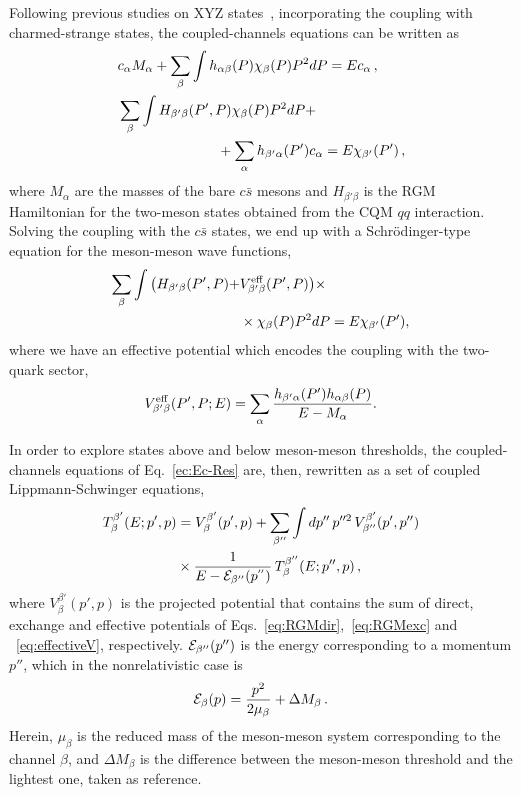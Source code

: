 \documentclass[aps, prd, floatfix, twocolumn, superscriptaddress, nofootinbib]{revtex4-1}
\begin{document}
Following previous studies on XYZ states~\cite{Ortega:2012rs},
incorporating the coupling with charmed-strange states, the coupled-channels
equations can be written as
\begin{equation}
\begin{split}
&
c_\alpha M_\alpha +  \sum_\beta \int h_{\alpha\beta}(P) \chi_\beta(P)P^2 dP = E
c_\alpha\,, \\
&
\sum_{\beta}\int H_{\beta'\beta}(P',P)\chi_{\beta}(P) P^2 dP + \\
&
\hspace{2.50cm} + \sum_\alpha h_{\beta'\alpha}(P') c_\alpha = E
\chi_{\beta'}(P')\,,
\label{ec:Ec-Res}
\end{split}
\end{equation}
where $M_\alpha$ are the masses of the bare $c\bar{s}$ mesons and 
$H_{\beta'\beta}$ is the RGM Hamiltonian for the two-meson states obtained from
the CQM $qq$ interaction. Solving the coupling with the $c\bar{s}$ states, we
end up with a Schr\"odinger-type equation for the meson-meson wave functions,
\begin{equation}
\begin{split}
\sum_{\beta} \int \big( H_{\beta'\beta}(P',P) + &
V^{\rm eff}_{\beta'\beta}(P',P) \big) \times \\
&
\times \chi_{\beta}(P) {P}^2 dP = E \chi_{\beta'}(P'),
\label{ec:Ec1}
\end{split}
\end{equation}
where we have an effective potential which encodes the coupling with the two-quark sector,
\begin{equation}\label{eq:effectiveV}
V^{\rm eff}_{\beta'\beta}(P',P;E)=\sum_{\alpha}\frac{h_{\beta'\alpha}(P')
h_{\alpha\beta}(P)}{E-M_{\alpha}}.
\end {equation}

In order to explore states above and below meson-meson thresholds, the coupled-channels equations of Eq.~\eqref{ec:Ec-Res} are, then, rewritten as a set of coupled Lippmann-Schwinger equations,
\begin{align}
T_{\beta}^{\beta'}(E;p',p) &= V_{\beta}^{\beta'}(p',p) + \sum_{\beta''} \int
dp''\, p^{\prime\prime2}\, V_{\beta''}^{\beta'}(p',p'') \nonumber \\
&
\times \frac{1}{E-{\cal E}_{\beta''}(p^{''})}\, T_{\beta}^{\beta''}(E;p'',p) \,,
\end{align}
where $V_{\beta}^{\beta'}(p',p)$ is the projected potential that contains the sum of direct, exchange and effective potentials of Eqs.~\eqref{eq:RGMdir},~\eqref{eq:RGMexc} and ~\eqref{eq:effectiveV}, respectively. ${\cal E}_{\beta''}(p'')$ is the energy corresponding to a momentum $p''$, which in the nonrelativistic case is
\begin{equation}
{\cal E}_{\beta}(p) = \frac{p^2}{2\mu_{\beta}} + \Delta M_{\beta} \,.
\end{equation}
Herein, $\mu_{\beta}$ is the reduced mass of the meson-meson system corresponding to the channel $\beta$, and $\Delta M_{\beta}$ is the difference between the meson-meson threshold and the lightest one, taken as reference.
\end{document}
